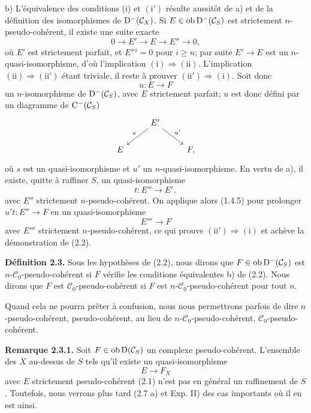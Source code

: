 \documentclass[11pt]{article}
\begin{document}
b) L'équivalence des conditions (i) et \((\mathrm{i}')\) résulte aussitôt de a) et de la définition des isomorphismes de \(\mathrm D^-(\mathcal C_X)\). Si \(E\in\operatorname{ob}\mathrm D^-(\mathcal C_S)\) est strictement \(n\)-pseudo-cohérent, il existe une suite exacte
\[
  0\longrightarrow E'\longrightarrow E\longrightarrow E''\longrightarrow 0,
\]
où \(E'\) est strictement parfait, et \(E''{}^i=0\) pour \(i\geq n\); par suite \(E'\to E\) est un \(n\)-quasi-isomorphisme, d'où l'implication \((\mathrm{i})\Rightarrow(\mathrm{ii})\). L'implication \((\mathrm{ii})\Rightarrow(\mathrm{ii}')\) étant triviale, il reste à prouver \((\mathrm{ii}')\Rightarrow(\mathrm{i})\). Soit donc
\[
  u:E\longrightarrow F
\]
un \(n\)-isomorphisme de \(\mathrm D^-(\mathcal C_S)\), avec \(E\) strictement parfait; \(u\) est donc défini par un diagramme de \(\mathrm C^-(\mathcal C_S)\)
\[
\begin{tikzcd}
& E' \arrow[dl,"s"'] \arrow[dr,"u'"]\\
E && F ,
\end{tikzcd}
\]
où \(s\) est un quasi-isomorphisme et \(u'\) un \(n\)-quasi-isomorphisme. En vertu de a), il existe, quitte à raffiner \(S\), un quasi-isomorphisme
\[
  t:E''\longrightarrow E',
\]
avec \(E''\) strictement \(n\)-pseudo-cohérent. On applique alors (1.4.5) pour prolonger \(u't:E''\to F\) en un quasi-isomorphisme
\[
  E'''\longrightarrow F
\]
avec \(E'''\) strictement \(n\)-pseudo-cohérent, ce qui prouve \((\mathrm{ii}')\Rightarrow(\mathrm{i})\) et achève la démonstration de (2.2).

\textbf{Définition 2.3.} Sous les hypothèses de (2.2), nous dirons que \(F\in\operatorname{ob}\mathrm D^-(\mathcal C_S)\) est \(n\)-\(\mathcal C_0\)-pseudo-cohérent si \(F\) vérifie les conditions équivalentes b) de (2.2). Nous dirons que \(F\) est \(\mathcal C_0\)-pseudo-cohérent si \(F\) est \(n\)-\(\mathcal C_0\)-pseudo-cohérent pour tout \(n\).

Quand cela ne pourra prêter à confusion, nous nous permettrons parfois de dire \(n\)-pseudo-cohérent, pseudo-cohérent, au lieu de \(n\)-\(\mathcal C_0\)-pseudo-cohérent, \(\mathcal C_0\)-pseudo-cohérent.

\textbf{Remarque 2.3.1.} Soit \(F\in\operatorname{ob}\mathrm D(\mathcal C_S)\) un complexe pseudo-cohérent. L'ensemble des \(X\) au-dessus de \(S\) tels qu'il existe un quasi-isomorphisme
\[
  E\longrightarrow F_X
\]
avec \(E\) strictement pseudo-cohérent (2.1) n'est pas en général un raffinement de \(S\). Toutefois, nous verrons plus tard (2.7 a) et Exp. II) des cas importants où il en est ainsi.
\end{document}

